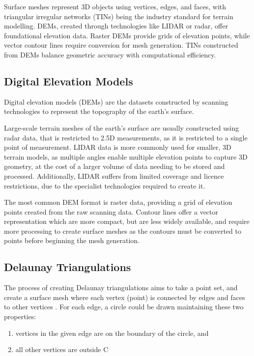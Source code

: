 \documentclass[12pt]{article}
\begin{document}
Surface meshes represent 3D objects using vertices, edges, and faces, with triangular irregular networks (TINs) being the industry standard for terrain modelling. DEMs, created through technologies like LIDAR or radar, offer foundational elevation data. Raster DEMs provide grids of elevation points, while vector contour lines require conversion for mesh generation. TINs constructed from DEMs balance geometric accuracy with computational efficiency.

\subsection{Digital Elevation Models}

Digital elevation models (DEMs) are the datasets constructed by scanning technologies to represent the topography of the earth's surface.

Large-scale terrain meshes of the earth's surface are usually constructed using radar data, that is restricted to 2.5D measurements, as it is restricted to a single point of measurement. LIDAR data is more commonly used for smaller, 3D terrain models, as multiple angles enable multiple elevation points to capture 3D geometry, at the cost of a larger volume of data needing to be stored and processed. Additionally, LIDAR suffers from limited coverage and licence restrictions, due to the specialist technologies required to create it.

The most common DEM format is raster data, providing a grid of elevation points created from the raw scanning data. Contour lines offer a vector representation which are more compact, but are less widely available, and require more processing to create surface meshes as the contours must be converted to points before beginning the mesh generation.

\subsection{Delaunay Triangulations}\label{section:cs:dt}

The process of creating Delaunay triangulations aims to take a point set, and create a surface mesh where each vertex (point) is connected by edges and faces to other vertices \autocite{preparata2012computational}. For each edge, a circle could be drawn maintaining these two properties:

\begin{enumerate}[(1)]
  \item vertices in the given edge are on the boundary of the circle, and
        \clearpage\item all other vertices are outside C
\end{enumerate}
\end{document}
